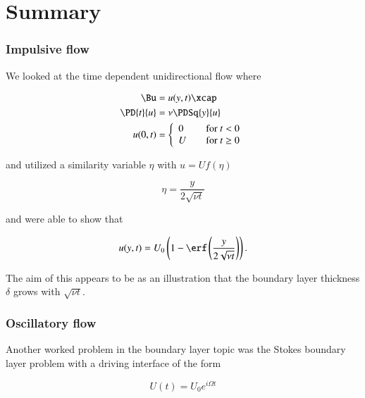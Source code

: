 \section{Summary}
\subsubsection{Impulsive flow}

We looked at the time dependent unidirectional flow where

\begin{align}\label{eqn:continuumFluidsReview:2230}
\Bu &= u(y, t) \xcap \\
\PD{t}{u} &= \nu \PDSq{y}{u} \\
u(0, t) &=
\left\{
\begin{array}{l l}
0 & \quad \mbox{for $t < 0$} \\
U & \quad \mbox{for $t \ge 0$}
\end{array}
\right.
\end{align}

and utilized a similarity variable $\eta$ with $u = U f(\eta)$

\begin{equation}\label{eqn:continuumFluidsReview:2250}
\eta = \frac{y}{2 \sqrt{\nu t}}
\end{equation}

and were able to show that

\begin{equation}\label{eqn:continuumFluidsReview:2270}
u(y, t) = U_0 \left(1 - \erf\left(\frac{y}{2 \sqrt{\nu t}}\right) \right).
\end{equation}

The aim of this appears to be as an illustration that the boundary layer thickness $\delta$ grows with $\sqrt{\nu t}$.


\subsubsection{Oscillatory flow}

Another worked problem in the boundary layer topic was the Stokes boundary layer problem with a driving interface of the form

\begin{equation}\label{eqn:continuumFluidsReview:2370}
U(t) = U_0 e^{i \Omega t}
\end{equation}

